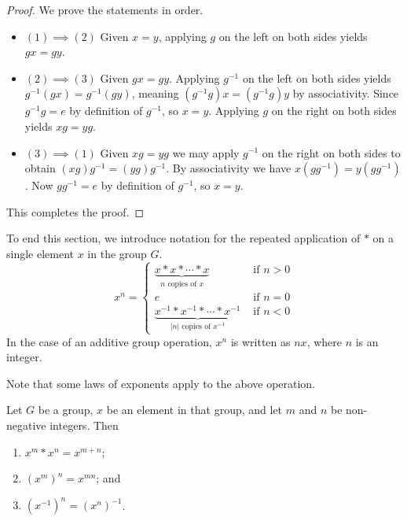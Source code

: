 \begin{proof}
    We prove the statements in order.
    \begin{itemize}
        \item $\boxed{(1) \implies (2)}$ Given $x = y$, applying $g$ on the left on both sides yields $gx = gy$.

        \item $\boxed{(2) \implies (3)}$ Given $gx = gy$. Applying
        $g^{-1}$ on the left on both sides yields $g^{-1}(gx) = g^{-1}(gy)$, meaning $(g^{-1}g)x = (g^{-1}g)y$ by associativity. Since $g^{-1}g = e$ by definition of $g^{-1}$, so $x = y$. Applying $g$ on the right on both sides yields $xg = yg$.

        \item $\boxed{(3) \implies (1)}$ Given $xg = yg$ we may apply $g^{-1}$ on the right on both sides to obtain $(xg)g^{-1} = (yg)g^{-1}$. By associativity we have $x(gg^{-1}) = y(gg^{-1})$. Now $gg^{-1} = e$ by definition of $g^{-1}$, so $x = y$.
    \end{itemize}
    This completes the proof.
\end{proof}

To end this section, we introduce notation for the repeated application of $\ast$ on a single element $x$ in the group $G$.
\[
    x^n =
    \begin{cases}
        \underbrace{x\ast x\ast \cdots \ast x}_{n \text{ copies of } x} & \text{ if } n > 0\\
        e & \text{ if } n=0 \\
        \underbrace{x^{-1}\ast x^{-1}\ast \cdots \ast x^{-1}}_{|n| \text{ copies of } x^{-1}} & \text{ if } n<0
    \end{cases}
\]
In the case of an additive group operation, $x^n$ is written as $nx$, where $n$ is an integer.

Note that some laws of exponents apply to the above operation.
\begin{proposition}\label{prop-group-laws-of-exponents}
    Let $G$ be a group, $x$ be an element in that group, and let $m$ and $n$ be non-negative integers. Then
    \begin{enumerate}
        \item $x^m \ast x^n = x^{m+n}$;
        \item $\left(x^m\right)^n = x^{mn}$; and
        \item $\left(x^{-1}\right)^n = \left(x^n\right)^{-1}$.
    \end{enumerate}
\end{proposition}

